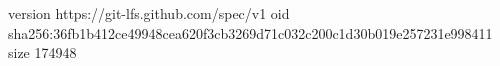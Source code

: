 version https://git-lfs.github.com/spec/v1
oid sha256:36fb1b412ce49948cea620f3cb3269d71c032c200c1d30b019e257231e998411
size 174948
